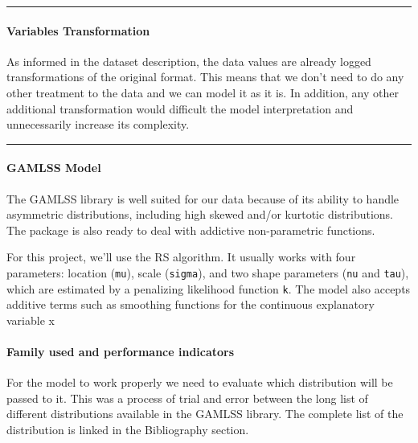 \documentclass[
]{article}
\begin{document}
\begin{center}\rule{0.5\linewidth}{0.5pt}\end{center}

\hypertarget{variables-transformation}{%
\paragraph{Variables Transformation}\label{variables-transformation}}

As informed in the dataset description, the data values are already
logged transformations of the original format. This means that we don't
need to do any other treatment to the data and we can model it as it is.
In addition, any other additional transformation would difficult the
model interpretation and unnecessarily increase its complexity.

\begin{center}\rule{0.5\linewidth}{0.5pt}\end{center}

\hypertarget{gamlss-model}{%
\paragraph{GAMLSS Model}\label{gamlss-model}}

The GAMLSS library is well suited for our data because of its ability to
handle asymmetric distributions, including high skewed and/or kurtotic
distributions. The package is also ready to deal with addictive
non-parametric functions.

For this project, we'll use the RS algorithm. It usually works with four
parameters: location (\texttt{mu}), scale (\texttt{sigma}), and two
shape parameters (\texttt{nu} and \texttt{tau}), which are estimated by
a penalizing likelihood function \texttt{k}. The model also accepts
additive terms such as smoothing functions for the continuous
explanatory variable x

\hypertarget{family-used-and-performance-indicators}{%
\paragraph{Family used and performance
indicators}\label{family-used-and-performance-indicators}}

For the model to work properly we need to evaluate which distribution
will be passed to it. This was a process of trial and error between the
long list of different distributions available in the GAMLSS library.
The complete list of the distribution is linked in the Bibliography
section.
\end{document}
